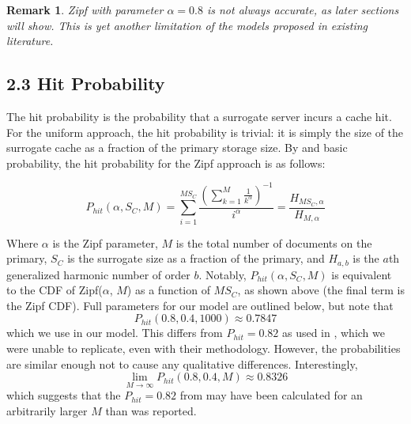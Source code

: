 \documentclass[
	a4paper, %
	10pt, %
	unnumberedsections, %
	twoside, %
]{LTJournalArticle}
\newtheorem*{remark}{Remark}
\begin{document}
\begin{remark}
    Zipf with parameter $\alpha=0.8$ is not always accurate, as later sections will show. This is yet another limitation of the models proposed in existing literature.
\end{remark}

\subsection{2.3  Hit Probability}

The hit probability is the probability that a surrogate server incurs a cache hit. For the uniform approach, the hit probability is trivial: it is simply the size of the surrogate cache as a fraction of the primary storage size. By \cite{749260} and basic probability, the hit probability for the Zipf approach is as follows:

\[ P_{hit}(\alpha, S_C, M) = \sum_{i=1}^{MS_C} \frac{\left( \sum_{k=1}^{M} \frac{1}{k^\alpha}\right)^{-1}}{i^\alpha} = \frac{H_{MS_C, \alpha}}{H_{M,\alpha}} \]

Where $\alpha$ is the Zipf parameter, $M$ is the total number of documents on the primary,  $S_C$ is the surrogate size as a fraction of the primary, and $H_{a,b}$ is the $a$th generalized harmonic number of order $b$. Notably, $P_{hit}(\alpha, S_C, M)$ is equivalent to the CDF of Zipf($\alpha$, $M$) as a function of $MS_C$, as shown above (the final term is the Zipf CDF). Full parameters for our model are outlined below, but note that 
\[P_{hit}(0.8, 0.4, 1000) \approx 0.7847\] 
which we use in our model. This differs from $P_{hit} = 0.82$ as used in \cite{biancoCDNs2017}, which we were unable to replicate, even with their methodology. However, the probabilities are similar enough not to cause any qualitative differences. Interestingly,
\[ \lim_{M\to\infty} P_{hit}(0.8, 0.4, M) \approx 0.8326\]
which suggests that the $P_{hit} = 0.82$ from \cite{biancoCDNs2017} may have been calculated for an arbitrarily larger $M$ than was reported.
\end{document}
